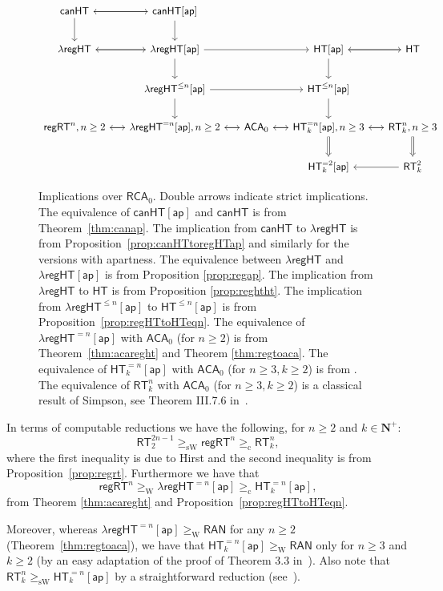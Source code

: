 \documentclass[a4paper,11pt]{article}
\newcommand\Nat{\mathbf{N}}
\newcommand\RCA{\mathsf{RCA}}
\newcommand\ACA{\mathsf{ACA}}
\newcommand\HT{\mathsf{HT}}
\newcommand\RT{\mathsf{RT}}
\newcommand\regHT{\mathsf{regHT}}
\newcommand\canHT{\mathsf{canHT}}
\newcommand\REG{\mathsf{regRT}}
\newcommand\compred{\mathrm{c}}
\newcommand\W{\mathrm{W}}
\newcommand\sW{\mathrm{sW}}
\newcommand\ap{\mathsf{ap}}
\newcommand\RAN{\mathsf{RAN}}
\begin{document}
\begin{figure}
\centering
\[\begin{tikzcd}[row sep=2em,column sep=1.5em]
\arrow[d] \canHT \arrow[r] & \arrow[l] \canHT[\ap] \arrow[d] &   &
 &\\
 \lambda\regHT \arrow[r] & \lambda\regHT[\ap] \arrow[l]\arrow[d] \arrow[rr] & &  \HT[\ap] 
\arrow[d]\arrow[r] & \HT \arrow[l]\\
 &  \lambda\regHT^{\leq n}[\ap] \arrow[d] \arrow[rr] & & \HT^{\leq n}[\ap] \arrow[d] &  \\
\REG^n, n \geq 2 \arrow[r]& \arrow[l] \lambda\regHT^{= n}[\ap], n\geq 2 \arrow[r] & \ACA_0 \arrow[l] \arrow[r] & \HT^{=n}_k[\ap], n\geq 3 \arrow[l] \arrow[r] \arrow[d, Rightarrow] & \arrow[l] \RT^n_k, n\geq 3 \arrow[d, Rightarrow]\\
 & & & \HT^{=2}_k[\ap] & \arrow[l] \RT^2_k \end{tikzcd}\]
\caption{
Implications over $\RCA_0$. Double arrows indicate strict implications.
The equivalence of $\canHT[\ap]$ and $\canHT$ is from Theorem~\ref{thm:canap}. The implication from $\canHT$ to 
$\lambda\regHT$ is from Proposition~\ref{prop:canHTtoregHTap} and similarly for the versions with apartness. The equivalence between $\lambda\regHT$ and 
$\lambda\regHT[\ap]$ is from Proposition \ref{prop:regap}. The implication from $\lambda\regHT$ to $\HT$ is from Proposition \ref{prop:reghtht}. The implication from 
$\lambda\regHT^{\leq n}[\ap]$ to $\HT^{\leq n}[\ap]$ is from Proposition~\ref{prop:regHTtoHTeqn}. The equivalence of $\lambda\regHT^{=n}[\ap]$ with $\ACA_0$ (for $n\geq 2$) is from Theorem~\ref{thm:acareght} and Theorem \ref{thm:regtoaca}. The equivalence of $\HT^{=n}_k[\ap]$ with $\ACA_0$ (for $n\geq 3, k\geq 2$) is from \cite{Car-Kol-Lep-Zda:20}. The equivalence of $\RT^n_k$ with $\ACA_0$ (for $n\geq 3, k\geq 2$) is a classical result of Simpson, see Theorem III.7.6 in~\cite{Sim:SOSOA}.}\label{fig:implicationsHT}
\end{figure}


In terms of computable reductions we have the following, for $n\geq 2$ and $k\in\Nat^+$: 
$$ \RT^{2n-1}_2 \geq_\sW \REG^n \geq_\compred \RT^n_k,$$
where the first inequality is due to Hirst \cite{Hir:phd} and the second inequality is from Proposition~\ref{prop:regrt}.
Furthermore we have that
$$\REG^n \geq_\W \lambda\regHT^{=n}[\ap] \geq_\compred \HT^{=n}_k[\ap],$$
from Theorem \ref{thm:acareght} and Proposition~\ref{prop:regHTtoHTeqn}.

Moreover, whereas $\lambda\regHT^{=n}[\ap] \geq_\W \RAN$ for any $n\geq 2$ (Theorem~\ref{thm:regtoaca}), we have
that $\HT^{=n}_k[\ap] \geq_\W \RAN$ only for $n\geq 3$ and $k\geq 2$ (by an easy adaptation of the proof of Theorem 3.3 in~\cite{Car-Kol-Lep-Zda:20}).
Also note that $\RT^n_k \geq_\sW \HT^{=n}_k[\ap]$ by a straightforward reduction (see~\cite{Car-Kol-Lep-Zda:20}).
\end{document}
